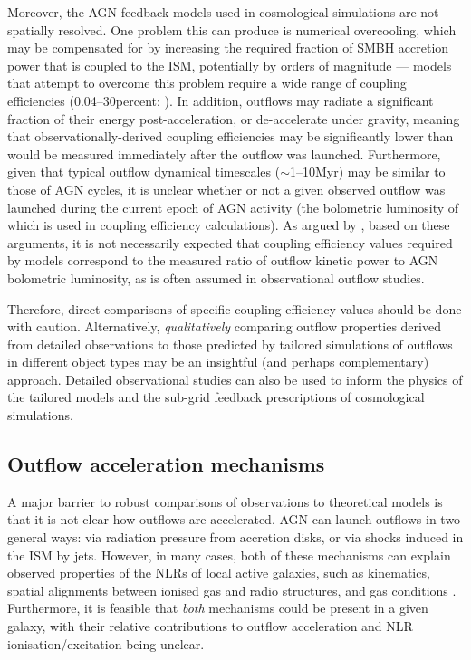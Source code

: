 Moreover, the AGN-feedback models used in cosmological simulations are not spatially resolved. One problem this can produce is numerical overcooling, which may be compensated for by increasing the required fraction of SMBH accretion power that is coupled to the ISM, potentially by orders of magnitude \citep{Weinberger2017} --- models that attempt to overcome this problem require a wide range of coupling efficiencies (0.04--30\;per\;cent: \citealt{Booth2009, Choi2012}). In addition, outflows may radiate a significant fraction of their energy post-acceleration, or de-accelerate under gravity, meaning that observationally-derived coupling efficiencies may be significantly lower than would be measured immediately after the outflow was launched. Furthermore, given that typical outflow dynamical timescales ($\sim$1--10\;Myr) may be similar to those of AGN cycles, it is unclear whether or not a given observed outflow was launched during the current epoch of AGN activity (the bolometric luminosity of which is used in coupling efficiency calculations). As argued by \citet{Harrison2018}, based on these arguments, it is not necessarily expected that coupling efficiency values required by models correspond to the measured ratio of outflow kinetic power to AGN bolometric luminosity, as is often assumed in observational outflow studies.

Therefore, direct comparisons of specific coupling efficiency values should be done with caution. Alternatively, \textit{qualitatively} comparing outflow properties derived from detailed observations to those predicted by tailored simulations of outflows in different object types may be an insightful (and perhaps complementary) approach. Detailed observational studies can also be used to inform the physics of the tailored models and the sub-grid feedback prescriptions of cosmological simulations.


\subsection{Outflow acceleration mechanisms}
\label{section: introduction: outflows: acceleration_mechanisms}

A major barrier to robust comparisons of observations to theoretical models is that it is not clear how outflows are accelerated. AGN can launch outflows in two general ways: via radiation pressure from accretion disks, or via shocks induced in the ISM by jets. However, in many cases, both of these mechanisms can explain observed properties of the NLRs of local active galaxies, such as kinematics, spatial alignments between ionised gas and radio structures, and gas conditions \citep{Ulvestad1981, Wilson1985, Whittle1988, Cecil1990, Capetti1995a, Capetti1995b, Axon1998, Crenshaw2000_N1068, Crenshaw2000_N4151, Das2005, Das2006, Mukherjee2016, Mukherjee2018, Meena2021}. Furthermore, it is feasible that \textit{both} mechanisms could be present in a given galaxy, with their relative contributions to outflow acceleration and NLR ionisation/excitation being unclear.

